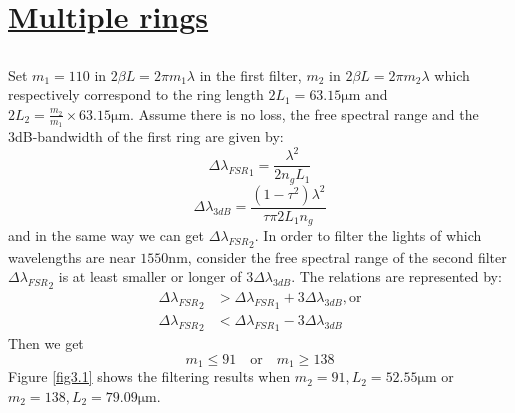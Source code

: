 \documentclass[fontsize=11pt]{scrartcl}
\begin{document}
\section{\uline{Multiple rings}}
\subsection{}
Set $m_1=110$ in $2\beta L = 2\pi m_1 \lambda$ in the first filter, 
$m_2$ in $2\beta L = 2\pi m_2 \lambda$
which respectively correspond to the ring length $2L_1 = 63.15\mathrm{\mu m}$
and $2L_2 = \frac{m_2}{m_1}\times 63.15\mathrm{\mu m}$. 
Assume there is no loss, the free spectral range and the 3dB-bandwidth
of the first ring
are given by:
\begin{equation}
    {\Delta \lambda_{F S R}}_1=\frac{\lambda^{2}}{2 n_{g} L_1}
\end{equation}
\begin{equation}
    \Delta \lambda_{3 d B}=\frac{\left(1-\tau^{2}\right) \lambda^{2}}{\tau  \pi 2 L_1 n_{g}}
\end{equation}
and in the same way we can get ${\Delta \lambda_{F S R}}_2$.
In order to filter the lights of which wavelengths are near $1550 \mathrm{nm}$,
consider the free spectral range of the second filter 
${\Delta \lambda_{F S R}}_2$ is 
at least smaller or longer of $3\Delta \lambda_{3 d B}$.
The relations are represented by:
\begin{equation}
    \begin{aligned}
    {\Delta \lambda_{F S R}}_2&>{\Delta \lambda_{F S R}}_1 + 3\Delta \lambda_{3 d B}, \mathrm{or}\\
    {\Delta \lambda_{F S R}}_2&<{\Delta \lambda_{F S R}}_1 - 3\Delta \lambda_{3 d B}
    \end{aligned}
\end{equation}
Then we get
\begin{equation}
    m_1 \le 91 \quad \mathrm{or} \quad m_1 \ge 138
\end{equation}
Figure \ref{fig3.1} shows the filtering results when $m_2=91, L_2=52.55 \mathrm{\mu m}$ 
or $m_2=138, L_2=79.09 \mathrm{\mu m}$.
\end{document}
